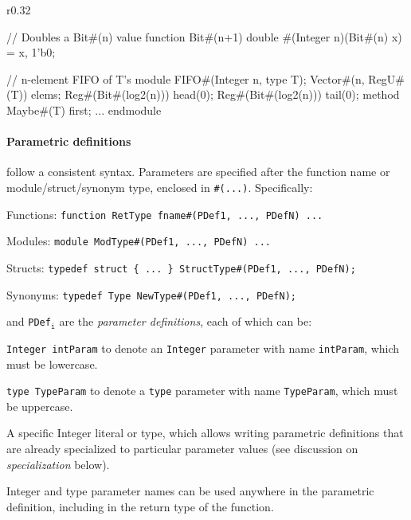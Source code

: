 \begin{wrapfigure}{r}{0.32\columnwidth}
\vspace{-3em}
\begin{mscode}
// Doubles a Bit#(n) value
function Bit#(n+1) double
  #(Integer n)(Bit#(n) x)
  = {x, 1'b0};

// n-element FIFO of T's
module FIFO#(Integer n,
             type T);
 Vector#(n, RegU#(T)) elems;
 Reg#(Bit#(log2(n))) head(0);
 Reg#(Bit#(log2(n))) tail(0);
 method Maybe#(T) first;
 ...
endmodule
\end{mscode}
\vspace{-3em}
\end{wrapfigure}

\paragraph{Parametric definitions} follow a consistent syntax.
Parameters are specified after the function name or module/struct/synonym type,
enclosed in \verb|#(...)|. Specifically:
\begin{compactitem}
\item Functions: \verb|function RetType fname#(PDef1, ..., PDefN) ...|
\item Modules: \verb|module ModType#(PDef1, ..., PDefN) ...|
\item Structs: \verb|typedef struct { ... } StructType#(PDef1, ..., PDefN);|
\item Synonyms: \verb|typedef Type NewType#(PDef1, ..., PDefN);|
\end{compactitem}
and \verb|PDef|$_{\texttt{i}}$ are the \emph{parameter definitions}, each of which can be:
\begin{compactitem}
\item \texttt{Integer intParam} to denote an \texttt{Integer} parameter with name \texttt{intParam}, which must be lowercase.
\item \texttt{type TypeParam} to denote a \texttt{type} parameter with name \texttt{TypeParam}, which must be uppercase.
\item A specific Integer literal or type, which allows writing parametric definitions that are already specialized to particular parameter values
  (see discussion on \emph{specialization} below).
\end{compactitem}
Integer and type parameter names can be used anywhere in the parametric definition,
including in the return type of the function.


